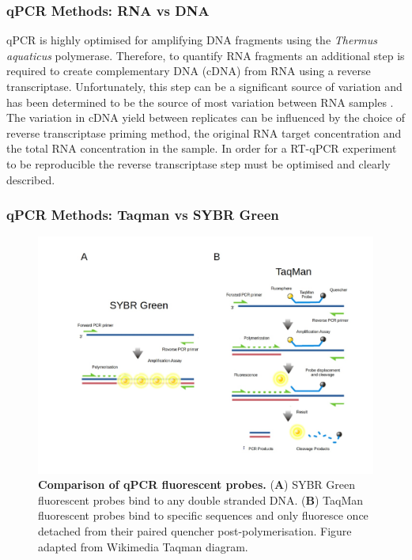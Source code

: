 \documentclass[../main.tex]{subfiles}
\begin{document}
\subsubsection{qPCR Methods: RNA vs DNA}

qPCR is highly optimised for amplifying DNA fragments using the \textit{Thermus aquaticus} polymerase. 
Therefore, to quantify RNA fragments an additional step is required to create complementary DNA (cDNA) from RNA using a reverse transcriptase. 
Unfortunately, this step can be a significant source of variation and has been determined to be the source of most variation between RNA samples \parencite{Stahlberg2004}. 
The variation in cDNA yield between replicates can be influenced by the choice of reverse transcriptase priming method, the original RNA target concentration and the total RNA concentration in the sample. 
In order for a RT-qPCR experiment to be reproducible the reverse transcriptase step must be optimised and clearly described. 

\subsubsection{qPCR Methods: Taqman vs SYBR Green}

\begin{figure}[h]

{\centering \includegraphics[width=\linewidth]{figures/taqmanvssybrgreen} 

}

\caption[Comparison of qPCR fluorescent probes.]{\textbf{Comparison of qPCR fluorescent probes.} (\textbf{A}) SYBR Green fluorescent probes bind to any double stranded DNA. (\textbf{B}) TaqMan fluorescent probes bind to specific sequences and only fluoresce once detached from their paired quencher post-polymerisation. Figure adapted from Wikimedia Taqman diagram.}\label{fig:qpcr-fluo-tech}
\end{figure}
\end{document}
